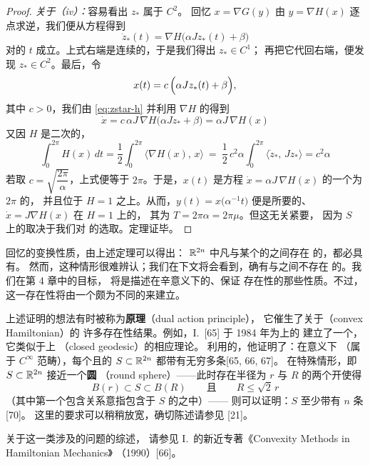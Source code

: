 \begin{proof}
\medskip
\noindent\emph{关于（iv）：}容易看出 $z_{*}$ 属于 $C^{2}$。%
回忆 $x=\nabla G(y)$ 由 $y=\nabla H(x)$ 逐点求逆，我们便从\trEuler{}方程得到
\begin{equation}\label{eq:zstar-h}
\dot{z}_{*}(t)=\nabla H\bigl(\alpha Jz_{*}(t)+\beta\bigr)
\end{equation}
对\trAlmostEvery{}的 $t$ 成立。上式右端是连续的，于是我们得出 $z_{*}\in C^{1}$；%
再把它代回右端，便发现 $z_{*}\in C^{2}$。最后，令
\[
x(t)=c\,\Bigl(\alpha Jz_{*}(t)+\beta\Bigr),
\]
其中 $c>0$，我们由 \eqref{eq:zstar-h} 并利用 $\nabla H$ 的\trHomogeneity{}得到
\[
\dot{x}=c\,\alpha J\,\nabla H\bigl(\alpha Jz_{*}+\beta\bigr)=\alpha J\,\nabla H(x)
\]
又因 $H$ 是二次\trHomogeneous{}的，
\[
\int_{0}^{2\pi}H(x)\,dt=\frac{1}{2}\int_{0}^{2\pi}\bigl\langle\nabla H(x),\,x\bigr\rangle\
 =\ \frac{1}{2}\,c^{2}\alpha\int_{0}^{2\pi}\langle\dot{z}_{*},\,Jz_{*}\rangle=c^{2}\alpha
\]
若取 $c=\sqrt{\dfrac{2\pi}{\alpha}}$，上式便等于 $2\pi$。于是，$x(t)$ 是方程%
$\dot{x}=\alpha J\,\nabla H(x)$ 的一个\trPeriodic{}为 $2\pi$ 的\trPeriodicSolution，%
并且位于\trEnergySurface{} $H=1$ 之上。从而，$y(t)=x\bigl(\alpha^{-1}t\bigr)$%
便是所要的、$\dot{x}=J\nabla H(x)$ 在 $H=1$ 上的\trPeriodicSolution，%
其\trPeriodic{}为 $T=2\pi\alpha=2\pi\mu$。但这无关紧要，%
因为 $S$ 上\trPeriodicSolution{}的\trPeriodic{}取决于我们对%
\trHamiltonianFunction{}的选取。定理证毕。
\end{proof}

回忆\trHamiltonianVectorField{}的变换性质，由上述定理可以得出：%
$\mathbb{R}^{2n}$ 中凡与某个\trStrictlyConvex{}的\trHypersurface{}之间存在%
\trSymplecticDiffeomorphism{}的\trHypersurface，都必具有\trClosedCharacteristic。%
然而，这种情形很难辨认；我们在下文将会看到，确有与\trConvex\trHypersurface{}之间不存在%
\trSymplecticDiffeomorphism{}的\trHypersurface。我们在第 4 章中的目标，%
将是描述\trHypersurface{}在辛意义下\trInvariant{}的、保证\trClosedCharacteristic{}%
存在性的那些性质。不过，这一存在性将由一个颇为不同的\trVariationalPrinciple{}来建立。

上述证明的想法有时被称为\textbf{\trDual\trAction{}原理}（dual action principle），%
它催生了关于\textbf{\trConvex\trHamiltonianFunction}（convex Hamiltonian）的%
许多存在性结果。例如，I.~\trEkeland{}[65] 于 1984 年为\trConvex\trHypersurface{}上的%
\trPeriodicSolution{}建立了一个\trMorseTheory，它类似于\trCompact\trRiemann\trManifold{}上%
\textbf{\trClosed\trGeodesic}（closed geodesic）的相应理论。%
利用\trEkeland{}的\trMorseTheory，他证明了：在\trGeneric{}意义下%
（属于 $C^{\infty}$ 范畴），每个\trCompact{}且\trConvex{}的\trHypersurface{}%
$S\subset\mathbb{R}^{2n}$ 都带有无穷多条\trPeriodicOrbit{}[65, 66, 67]。%
在特殊情形，即\trConvex\trSurface{} $S\subset\mathbb{R}^{2n}$ 接近一个\textbf{圆\trSphere}%
（round sphere）——此时存在半径为 $r$ 与 $R$ 的两个开\trBall{}使得
\[
B(r)\subset S\subset B(R)\qquad\text{且}\qquad R\leq\sqrt{2}\,r
\]
（其中第一个包含关系意指包含于 $S$ 的\trInterior{}之中）——%
则可以证明：$S$ 至少带有 $n$ 条\trClosedCharacteristic{}[70]。%
这里的\trConvexity{}要求可以稍稍放宽，确切陈述请参见 [21]。

关于这一类涉及\trConvex\trHamiltonianFunction{}的问题的综述，%
请参见 I.~\trEkeland{}的新近专著《Convexity Methods in Hamiltonian Mechanics》%
（1990）[66]。
